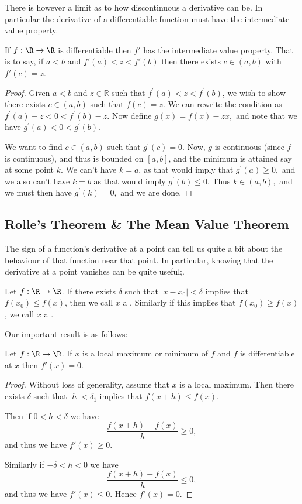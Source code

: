 There is however a limit as to how discontinuous a derivative can be. In particular the derivative of a differentiable function must have the intermediate value property.

\begin{theorem}
	If $f: \R \rightarrow \R$ is differentiable then $f'$ has the intermediate value property. That is to say, if $a < b$ and $f'(a) < z < f'(b)$ then there exists $c \in (a, b)$ with $f'(c) = z$.
\end{theorem}
\begin{proof}
Given $a<b$ and $z \in \mathbb{R}$ such that $f^{\prime}(a)<z<f^{\prime}(b)$, we wish to show there exists $c \in(a, b)$ such that $f(c)=z$. We can rewrite the condition as $f^{\prime}(a)-z<0<f^{\prime}(b)-z$. Now define $g(x)=f(x)-z x,$ and note that we have $g^{\prime}(a)<0<g^{\prime}(b)$.

We want to find $c \in(a, b)$ such that $g^{\prime}(c)=0$. Now, $g$ is continuous (since $f$ is continuous), and thus is bounded on $[a, b]$, and the minimum is attained say at some point $k$. We can't have $k=a$, as that would imply that $g^{\prime}(a) \geq 0,$ and we also can't have $k=b$ as that would imply $g^{\prime}(b) \leq 0$. Thus $k \in(a, b),$ and we must then have $g^{\prime}(k)=0,$ and we are done.
\end{proof}

\subsection{Rolle's Theorem \& The Mean Value Theorem}

The sign of a function's derivative at a point can tell us quite a bit about the behaviour of that function near that point.
In particular, knowing that the derivative at a point vanishes can be quite useful;.

\begin{definition}
	Let $f: \R \rightarrow \R$. If there exists $\delta$ such that $|x - x_0| < \delta$ implies that $f(x_0) \leq f(x)$, then we call $x$ a . 
	Similarly if this implies that $f(x_0) \geq f(x)$, we call $x$ a . 
\end{definition}

Our important result is as follows:

\begin{lemma}\label{lemma:maxima}
	Let $f: \R \rightarrow \R$. If $x$ is a local maximum or minimum of $f$ and $f$ is differentiable at $x$ then $f'(x) = 0$.
\end{lemma}
\begin{proof}
	Without loss of generality, assume that $x$ is a local maximum. Then there exists $\delta$ such that $|h| < \delta_1$ implies that $f(x + h) \leq f(x)$. 
	
	Then if $0 < h < \delta$ we have
	$$
		\frac{f(x + h) - f(x)}{h} \geq 0,
	$$
	and thus we have $f'(x) \geq 0$.

	Similarly if $- \delta < h < 0$ we have
	$$
	\frac{f(x + h) - f(x)}{h} \leq 0,
	$$
	and thus we have $f'(x) \leq 0$. Hence $f'(x) = 0$.
\end{proof}

